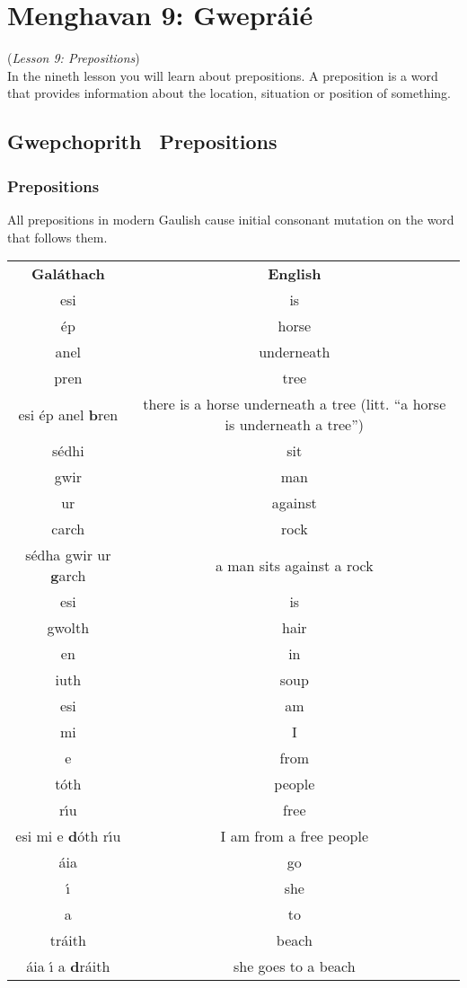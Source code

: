 \section{Menghavan 9: Gwepr\'{a}i\'{e}}
(\textit{Lesson 9: Prepositions})\\

In the nineth lesson you will learn about prepositions. A preposition is a word that provides information about the location, situation or position of something.

\subsection{Gwepchoprith \textendash\ Prepositions}
\subsubsection{Prepositions}

All prepositions in modern Gaulish cause initial consonant mutation on the word that follows them.
\begin{table}[H]
\centering
\begin{tabular}{cc}
  \toprule
  \textbf{Gal\'{a}thach} & \textbf{English}\\
  \cmidrule(lr){1-1}\cmidrule(lr){2-2}
  esi & is\\
  \'{e}p & horse\\
  anel & underneath\\
  pren & tree\\
  esi \'{e}p anel \textbf{b}ren & there is a horse underneath a tree (litt. ``a horse is underneath a tree'')\\
  \cmidrule(lr){1-1}\cmidrule(lr){2-2}
  s\'{e}dhi & sit\\
  gwir & man\\
  ur & against\\
  carch & rock\\
  s\'{e}dha gwir ur \textbf{g}arch & a man sits against a rock\\
  \cmidrule(lr){1-1}\cmidrule(lr){2-2}
  esi & is\\
  gwolth & hair\\
  en & in\\
  iuth & soup\\
  \cmidrule(lr){1-1}\cmidrule(lr){2-2}
  esi & am\\
  mi & I\\
  e & from\\
  t\'{o}th & people\\
  r\'{\i}u & free\\
  esi mi e \textbf{d}\'{o}th r\'{\i}u & I am from a free people\\
  \cmidrule(lr){1-1}\cmidrule(lr){2-2}
  \'{a}ia & go\\
  \'{\i} & she\\
  a & to\\
  tr\'{a}ith & beach\\
  \'{a}ia \'{\i} a \textbf{d}r\'{a}ith & she goes to a beach\\
  \bottomrule
\end{tabular}
\label{examples_prepositions}
\end{table}

